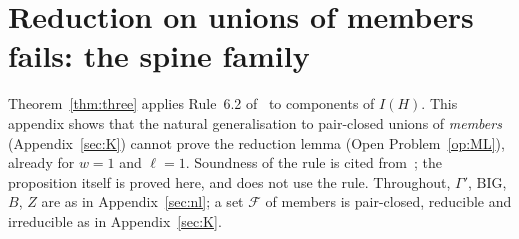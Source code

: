 \section{Reduction on unions of members fails: the spine family}\label{app:spine}\label{sec:reduction}
Theorem~\ref{thm:three} applies Rule~6.2 of~\cite{BFK18} to components of $I(H)$. This appendix shows that the natural generalisation to pair-closed unions of \emph{members} (Appendix~\ref{sec:K}) cannot prove the reduction lemma (Open Problem~\ref{op:ML}), already for $w=1$ and $\ell=1$. Soundness of the rule is cited from~\cite{BFK18}; the proposition itself is proved here, and does not use the rule. Throughout, $\Gamma'$, $\mathrm{BIG}$, $B$, $Z$ are as in Appendix~\ref{sec:nl}; a set $\mathcal F$ of members is pair-closed, reducible and irreducible as in Appendix~\ref{sec:K}.


